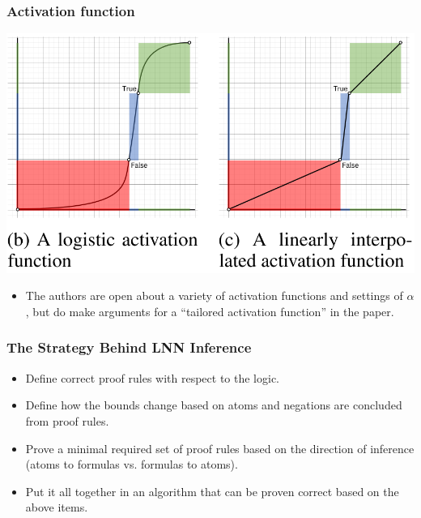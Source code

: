 \documentclass{beamer}
\begin{document}
\begin{frame}
  \frametitle{Activation function}
  \centerline{\includegraphics[width=.6\textwidth]{lnn2.png}}
  \begin{itemize}
  \item The authors are open about a variety of activation functions and
    settings of $\alpha$, but do make arguments for a ``tailored
    activation function'' in the paper.
  \end{itemize}
\end{frame}

\begin{frame}
\frametitle{The Strategy Behind LNN Inference}
\begin{itemize}
    \item Define correct proof rules with respect to the logic.
    \item Define how the bounds change based on atoms and negations
      are concluded from proof rules.
    \item Prove a minimal required set of proof rules based on the
      direction of inference (atoms to formulas vs. formulas to
      atoms).
    \item Put it all together in an algorithm that can be proven
      correct based on the above items.
\end{itemize}
\end{frame}
\end{document}

